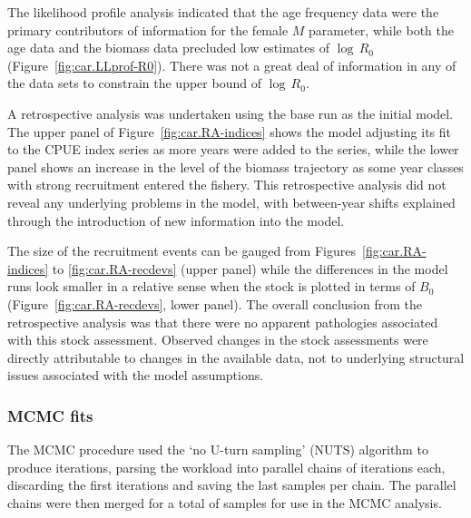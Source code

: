\documentclass[11pt]{book}
\begin{document}
The likelihood profile analysis indicated that the age frequency data were the primary contributors of information for the female $M$ parameter, while both the age data and the biomass data precluded low estimates of $\log\,R_0$ (Figure~\ref{fig:car.LLprof-R0}).
There was not a great deal of information in any of the data sets to constrain the upper bound of $\log\,R_0$.

A retrospective analysis was undertaken using the base run as the initial model.
The upper panel of Figure~\ref{fig:car.RA-indices} shows the model adjusting its fit to the CPUE index series as more years were added to the series, while the lower panel shows an increase in the level of the biomass trajectory as some year classes with strong recruitment entered the fishery.
This retrospective analysis did not reveal any underlying problems in the model, with between-year shifts explained through the introduction of new information into the model.

The size of the recruitment events can be gauged from Figures~\ref{fig:car.RA-indices} to \ref{fig:car.RA-recdevs} (upper panel) while the differences in the model runs look smaller in a relative sense when the stock is plotted in terms of $B_0$ (Figure~\ref{fig:car.RA-recdevs}, lower panel).
The overall conclusion from the retrospective analysis was that there were no apparent pathologies associated with this stock assessment.
Observed changes in the stock assessments were directly attributable to changes in the available data, not to underlying structural issues associated with the model assumptions.


\graphicspath{{C:/Users/haighr/Files/GFish/PSARC/PSARC_2020s/PSARC22/CAR/Data/SS/CAR2022/Run24/MPD.24.01/}}
\clearpage

\subsubsection{MCMC fits}\label{sssMCMC}


The MCMC procedure used the `no U-turn sampling' (NUTS) algorithm \citep{Monnahan-Kristensen:2018, Monnahan-etal:2019} to produce \nSimsBase{} iterations, parsing the workload into \nChains{} parallel chains \citep{R:2015_snowfall} of \cSimsBase{} iterations each, discarding the first \cBurnBase{} iterations and saving the last \cSamps{} samples per chain.
The parallel chains were then merged for a total of \Nmcmc{} samples for use in the MCMC analysis.
\end{document}
